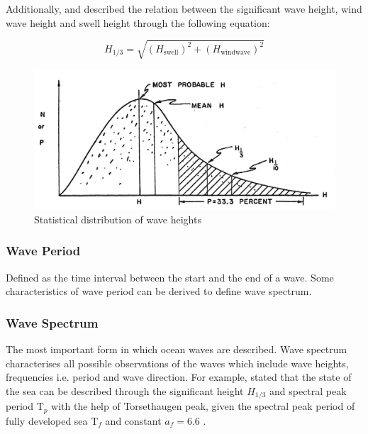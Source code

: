 Additionally,  and  described the relation between the significant wave height, wind wave height and swell height through the following equation:

\begin{equation}\label{eqn:H_sig_root}
    H_{1/3} = \sqrt{(H_{\text{swell}})^2 + (H_{\text{windwave}})^2} 
\end{equation}

\begin{figure}[h]
    \centering
        \includegraphics[width=.75\textwidth]{02_figures/Bretschneider_1965_wavedist.jpg}
        \caption{Statistical distribution of wave heights }
        \label{fig:wavestats}
\end{figure}

\pagebreak

\subsubsection*{Wave Period}

Defined as the time interval between the start and the end of a wave. Some characteristics of wave period can be derived to define wave spectrum.

\subsubsection*{Wave Spectrum}

The most important form in which ocean waves are described. Wave spectrum characterises all possible observations of the waves which include wave heights, frequencies i.e. period and wave direction. For example,  stated that the state of the sea can be described through the significant height $H_{1/3}$ and spectral peak period $\text{T}_p$ with the help of Torsethaugen peak, given the spectral peak period of fully developed sea $\text{T}_f$ and constant $a_f = 6.6$  . 

